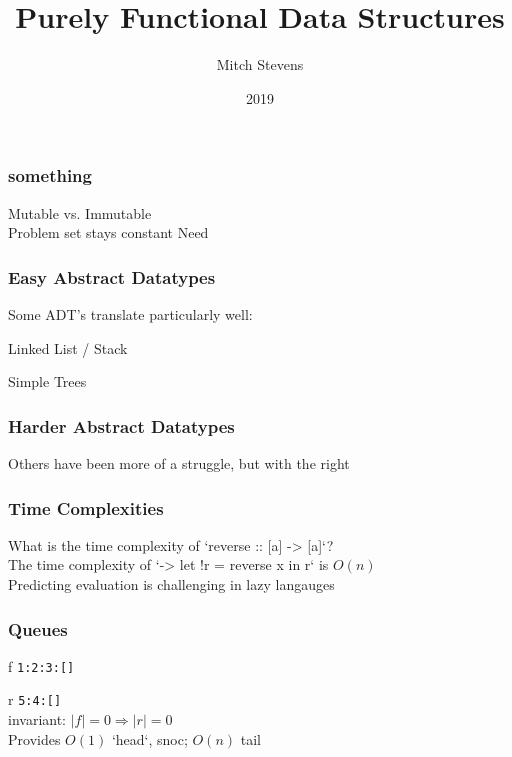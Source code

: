\documentclass{beamer}
\begin{document}
\title{Purely Functional Data Structures}
\author{Mitch Stevens}
\date{2019}
 
\newcommand{\labeledCode}[2]
{
  \huge \textcolor{blue!30}{#1} \colorbox{blue!30}{\texttt{#2}}
} 

\newenvironment{slide}[1]
  { \begin{frame}
    \frametitle{#1}
  }
  { \end{frame}
  }

 
\frame{\titlepage}

\begin{slide}{something}
  Mutable vs. Immutable \\
  Problem set stays constant
  Need
\end{slide}

\begin{slide}{Easy Abstract Datatypes}
  Some ADT's translate particularly well:
  \begin{itemise}
  \item Linked List / Stack
  \item Simple Trees
  \item 
  \end{itemise}  
\end{slide}

\begin{slide}{Harder Abstract Datatypes}
  Others have been more of a struggle, but with the right
\end{slide}

\begin{slide}{Time Complexities}
  What is the time complexity of `reverse :: [a] -> [a]`? \\
  The time complexity of `\x -> let !r = reverse x in r` is $O(n)$ \\
  Predicting evaluation is challenging in lazy langauges \\
\end{slide}

\begin{slide}{Queues}
  \labeledCode{f}{1:2:3:[]} \labeledCode{r}{5:4:[]} \\
  invariant: $|f| = 0 \Rightarrow |r| = 0$ \\
  Provides $O(1)$ `head`, snoc; $O(n)$ tail
\end{slide}

\begin{slide}{}
      
\end{slide}
\end{document}
